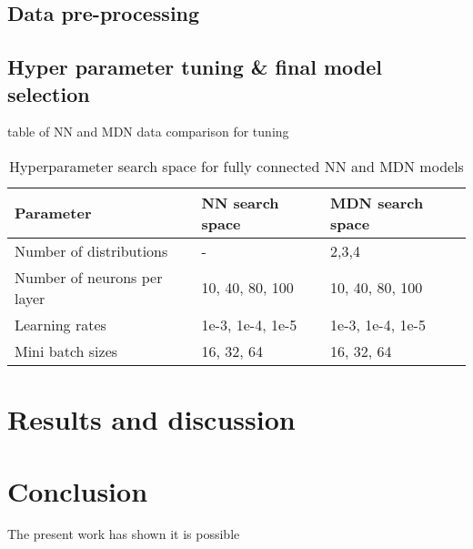 \documentclass[a4paper,fleqn]{cas-sc}
\begin{document}
\subsection{Data pre-processing}


\subsection{Hyper parameter tuning \& final model selection}

table of NN and MDN data comparison for tuning

\clearpage
\begin{table}[h!]
\caption{Hyperparameter search space for fully connected NN and MDN models}\label{tbl_tuning}
\begin{tabular*}{\tblwidth}{p{}p{}p{}}
\toprule
 Parameter& NN search space & MDN search space \\ %
\midrule
 Number of distributions & - & 2,3,4  \\
 Number of neurons per layer & 10, 40, 80, 100  & 10, 40, 80, 100\\
 Learning rates & 1e-3, 1e-4, 1e-5 &  1e-3, 1e-4, 1e-5   \\
 Mini batch sizes  & 16, 32, 64 & 16, 32, 64  \\
\bottomrule
\end{tabular*}
\end{table}





\section{Results and discussion}

\section{Conclusion}

The present work has shown it is possible
\printcredits

%




\bio{}
\endbio

\end{document}
